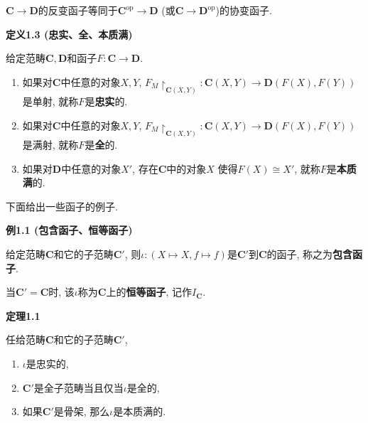 \documentclass[UTF8]{ctexart}
\begin{document}
\vspace{10pt}

$\mathbf{C}\to\mathbf{D}$的反变函子等同于$\mathbf{C}^{\mathrm{op}}\to\mathbf{D}$
(或$\mathbf{C}\to\mathbf{D}^{\mathrm{op}}$)的协变函子.

\vspace{10pt}

\hypertarget{sec:定义1.3}{}
\noindent\textbf{定义1.3 (忠实、全、本质满)}

给定范畴$\mathbf{C},\mathbf{D}$和函子$F:\mathbf{C}\to\mathbf{D}$.
\begin{enumerate}
    \item 如果对$\mathbf{C}$中任意的对象$X,Y$,
    $F_M\!\!\restriction_{\mathbf{C}(X,Y)}:\mathbf{C}(X,Y)\to\mathbf{D}(F(X),F(Y))$
    是单射, 就称$F$是\textbf{忠实}的.
    \item 如果对$\mathbf{C}$中任意的对象$X,Y$,
    $F_M\!\!\restriction_{\mathbf{C}(X,Y)}:\mathbf{C}(X,Y)\to\mathbf{D}(F(X),F(Y))$
    是满射, 就称$F$是\textbf{全}的.
    \item 如果对$\mathbf{D}$中任意的对象$X'$, 存在$\mathbf{C}$中的对象$X$
    使得$F(X)\cong X'$, 就称$F$是\textbf{本质满}的.
\end{enumerate}





\newpage

下面给出一些函子的例子.

\vspace{10pt}

\hypertarget{sec:例1.1}{}
\noindent\textbf{例1.1 (包含函子、恒等函子)}

给定范畴$\mathbf{C}$和它的子范畴$\mathbf{C}'$,
则$\iota:(X\mapsto X,f\mapsto f)$是$\mathbf{C}'$到$\mathbf{C}$的函子,
称之为\textbf{包含函子}.

当$\mathbf{C}'=\mathbf{C}$时, 该$\iota$称为$\mathbf{C}$上的\textbf{恒等函子},
记作$I_{\mathbf{C}}$.

\vspace{10pt}

\hypertarget{sec:定理1.1}{}
\noindent\textbf{定理1.1}

任给范畴$\mathbf{C}$和它的子范畴$\mathbf{C}'$,
\begin{enumerate}
    \item $\iota$是忠实的,
    \item $\mathbf{C}'$是全子范畴当且仅当$\iota$是全的,
    \item 如果$\mathbf{C}'$是骨架, 那么$\iota$是本质满的.
\end{enumerate}
\end{document}
